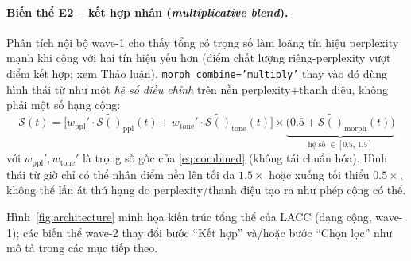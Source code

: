 \documentclass[12pt,a4paper]{article}
\newcommand{\score}[1]{\mathcal{S}(#1)}      %
\newcommand{\method}[1]{\textsc{#1}}         %
\begin{document}
\paragraph{Biến thể E2 -- kết hợp nhân (\textit{multiplicative blend}).} Phân tích nội bộ wave-1 cho thấy tổng có trọng số làm loãng tín hiệu perplexity mạnh khi cộng với hai tín hiệu yếu hơn (điểm chất lượng riêng-perplexity vượt điểm kết hợp; xem Thảo luận). \texttt{morph\_combine='multiply'} thay vào đó dùng hình thái từ như một \textit{hệ số điều chỉnh} trên nền perplexity+thanh điệu, không phải một số hạng cộng:
\begin{equation}\label{eq:combined_mult}
    \score{t} = \Big[w_{\text{ppl}}' \cdot \tilde{\score{}}_{\text{ppl}}(t) + w_{\text{tone}}' \cdot \tilde{\score{}}_{\text{tone}}(t)\Big] \times \underbrace{\big(0.5 + \tilde{\score{}}_{\text{morph}}(t)\big)}_{\text{hệ số } \in [0.5,\,1.5]}
\end{equation}
với $w_{\text{ppl}}', w_{\text{tone}}'$ là trọng số gốc của \eqref{eq:combined} (không tái chuẩn hóa). Hình thái từ giờ chỉ có thể nhân điểm nền lên tối đa $1.5\times$ hoặc xuống tối thiểu $0.5\times$, không thể lấn át thứ hạng do perplexity/thanh điệu tạo ra như phép cộng có thể.

Hình~\ref{fig:architecture} minh họa kiến trúc tổng thể của \method{LACC} (dạng cộng, wave-1); các biến thể wave-2 thay đổi bước ``Kết hợp'' và/hoặc bước ``Chọn lọc'' như mô tả trong các mục tiếp theo.
\end{document}
